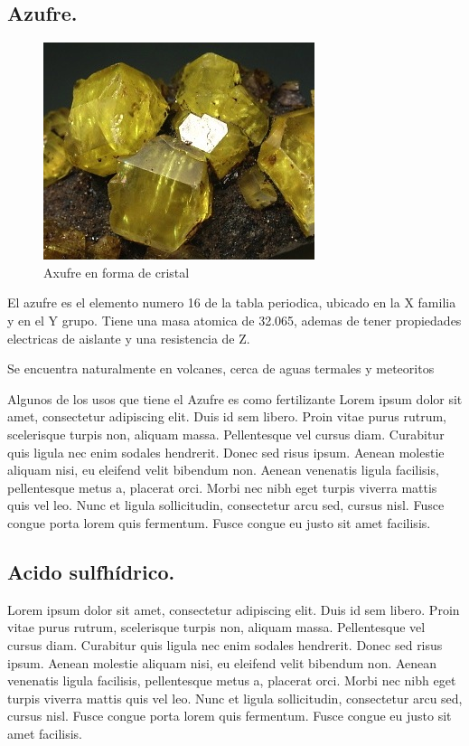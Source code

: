 \documentclass[letter]{article}
\begin{document}
\subsection{Azufre.}
\begin{figure}
	\includegraphics[width=1\linewidth]{azufre} 
	\caption{Axufre en forma de cristal}
	\label{fig:subim1}
\end{figure}
El azufre es el elemento numero 16 de la tabla periodica, ubicado en la X familia y en el Y grupo. Tiene una masa atomica de 32.065, ademas de tener propiedades electricas de aislante y una resistencia de Z.\par
Se encuentra naturalmente en volcanes, cerca de aguas termales y meteoritos \par
Algunos de los usos que tiene el Azufre es como fertilizante \cite{acuna1991fertilizacion}
Lorem ipsum dolor sit amet, consectetur adipiscing elit. Duis id sem libero. Proin vitae purus rutrum, scelerisque turpis non, aliquam massa. Pellentesque vel cursus diam. Curabitur quis ligula nec enim sodales hendrerit. Donec sed risus ipsum. Aenean molestie aliquam nisi, eu eleifend velit bibendum non. Aenean venenatis ligula facilisis, pellentesque metus a, placerat orci. Morbi nec nibh eget turpis viverra mattis quis vel leo. Nunc et ligula sollicitudin, consectetur arcu sed, cursus nisl. Fusce congue porta lorem quis fermentum. Fusce congue eu justo sit amet facilisis.\par
\subsection{Acido sulfhídrico.}
Lorem ipsum dolor sit amet, consectetur adipiscing elit. Duis id sem libero. Proin vitae purus rutrum, scelerisque turpis non, aliquam massa. Pellentesque vel cursus diam. Curabitur quis ligula nec enim sodales hendrerit. Donec sed risus ipsum. Aenean molestie aliquam nisi, eu eleifend velit bibendum non. Aenean venenatis ligula facilisis, pellentesque metus a, placerat orci. Morbi nec nibh eget turpis viverra mattis quis vel leo. Nunc et ligula sollicitudin, consectetur arcu sed, cursus nisl. Fusce congue porta lorem quis fermentum. Fusce congue eu justo sit amet facilisis.\par
\end{document}
